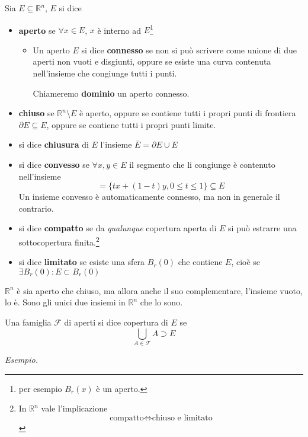 \documentclass[10pt,a4paper,twoside,openright]{book}
\begin{document}
Sia $E\subseteq \mathbb{R}^{n}$, $E$ si dice
\begin{itemize}
\item \textbf{aperto} se $\forall x\in E$, $x$ è interno ad $E$\footnote{per esempio $B_{r}(x)$ è un aperto.}
\begin{itemize}
\item Un aperto $E$ si dice \textbf{connesso} se non si può scrivere come unione di due aperti non vuoti e disgiunti, oppure se esiste una curva contenuta nell'insieme che congiunge tutti i punti.

Chiameremo \textbf{dominio} un aperto connesso.
\end{itemize}
\item \textbf{chiuso} se $\mathbb{R}^{n} \setminus E$ è aperto, oppure se contiene tutti i propri punti di frontiera $\partial E\subseteq E$, oppure se contiene tutti i propri punti limite.
\item si dice \textbf{chiusura} di $E$ l'insieme $\displaystyle \overline{E} =\partial E\cup E$
\item si dice \textbf{convesso} se $\forall x,y\in E$ il segmento che li congiunge è contenuto nell'insieme\begin{equation*}
[ x,y] =\{tx+(1-t) y,0\leqslant t\leqslant 1\} \subseteq E
\end{equation*}Un insieme convesso è automaticamente connesso, ma non in generale il contrario.
\item si dice \textbf{compatto} se da \textit{qualunque} copertura aperta di $E$ si può estrarre una sottocopertura finita.\footnote{In $\displaystyle \mathbb{R}^{n}$ vale l'implicazione
\begin{equation*}
\text{compatto} \Leftrightarrow \text{chiuso e limitato}
\end{equation*}}
\item si dice \textbf{limitato} se esiste una sfera $B_{r}(0)$ che contiene $E$, cioè se $\displaystyle \exists B_{r}(0) :E\subset B_{r}(0)$
\end{itemize}
\begin{nb}
$\mathbb{R}^{n}$ è sia aperto che chiuso, ma allora anche il suo complementare, l'insieme vuoto, lo è. Sono gli unici due insiemi in $\mathbb{R}^{n}$ che lo sono.
\end{nb}
\begin{definition}
[Copertura] Una famiglia $\mathcal{F}$ di aperti si dice copertura di $E$ se
\begin{equation*}
\bigcup _{A\in \mathcal{F}} A\supset E
\end{equation*}
\end{definition}
\textit{Esempio.}
\end{document}
